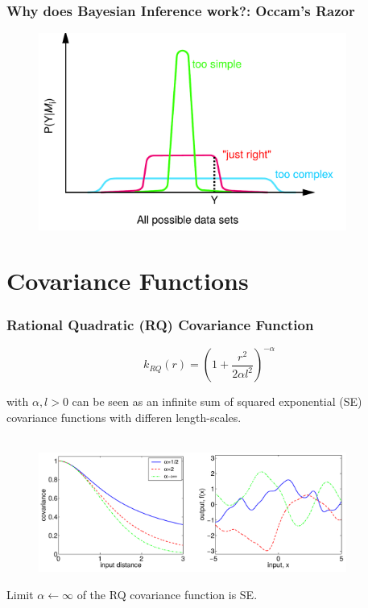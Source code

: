 \documentclass[10pt]{beamer}
\begin{document}
  \begin{frame}
    \frametitle{Why does Bayesian Inference work?: Occam's Razor}

    \begin{figure}
      \centering
      \includegraphics[width=0.9\textwidth]{occamsRazor.png}
    \end{figure}
  \end{frame}

  \section{Covariance Functions}

  \begin{frame}
    \frametitle{Rational Quadratic (RQ) Covariance Function}

    \begin{equation*}
      k_{RQ}(r) = \left( 1 + \frac{r^2}{2 \alpha l^2} \right)^{- \alpha}
    \end{equation*}

    with $\alpha, l > 0$ can be seen as an infinite sum of squared exponential (SE) covariance functions with differen length-scales.\\~

    \begin{figure}
      \centering
      \includegraphics[width=0.9\textwidth]{rationalCovFunc.png}
    \end{figure}

    \begin{center}
      Limit $\alpha \leftarrow \infty$ of the RQ covariance function is SE.
    \end{center}

  \end{frame}
\end{document}
